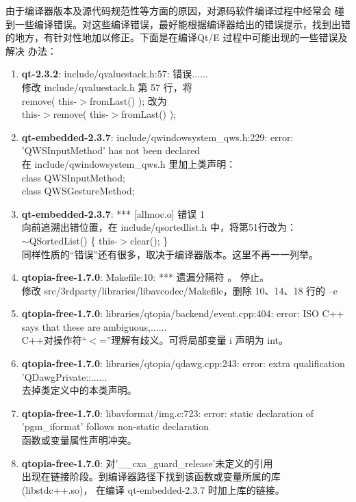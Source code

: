 由于编译器版本及源代码规范性等方面的原因，对源码软件编译过程中经常会
碰到一些编译错误。对这些编译错误，最好能根据编译器给出的错误提示，找到出错
的地方，有针对性地加以修正。下面是在编译Qt/E 过程中可能出现的一些错误及解决
办法：
\begin{enumerate}
  \item {\bf qt-2.3.2}: include/qvaluestack.h:57: 错误......\\
		修改 include/qvaluestack.h 第 57 行，将\\
		remove( this-$>$fromLast() ); 改为\\
		this-$>$remove( this-$>$fromLast() );
  \item {\bf qt-embedded-2.3.7}: include/qwindowsystem\_qws.h:229: error:
		'QWSInputMethod' has not been declared\\
		在 include/qwindowsystem\_qws.h 里加上类声明：\\
		class   QWSInputMethod;\\
		class   QWSGestureMethod;
  \item {\bf qt-embedded-2.3.7}: *** [allmoc.o] 错误 1\\
		向前追溯出错位置，在 include/qsortedlist.h 中，将第51行改为：\\
		$\sim$QSortedList() \{ this-$>$clear(); \}\\
		同样性质的``错误''还有很多，取决于编译器版本。这里不再一一列举。
  \item {\bf qtopia-free-1.7.0}: Makefile:10: *** 遗漏分隔符 。 停止。\\
		修改 src/3rdparty/libraries/libavcodec/Makefile，删除 10、14、18
		行的 --e
  \item {\bf qtopia-free-1.7.0}: libraries/qtopia/backend/event.cpp:404:
		error: ISO C++ says that these are ambiguous,......\\
		C++对操作符``$<$=''理解有歧义。可将局部变量 i 声明为 int。
  \item {\bf qtopia-free-1.7.0}: libraries/qtopia/qdawg.cpp:243: error:
		extra qualification 'QDawgPrivate::......\\
		去掉类定义中的本类声明。
  \item {\bf qtopia-free-1.7.0}: libavformat/img.c:723: error: static
		declaration of 'pgm\_iformat' follows non-static declaration\\
		函数或变量属性声明冲突。
  \item {\bf qtopia-free-1.7.0}: 对'\_\_cxa\_guard\_release'未定义的引用\\
		出现在链接阶段。到编译器路径下找到该函数或变量所属的库(libstdc++.so)，
		在编译 qt-embedded-2.3.7 时加上库的链接。
\end{enumerate}
\rm\normalsize
